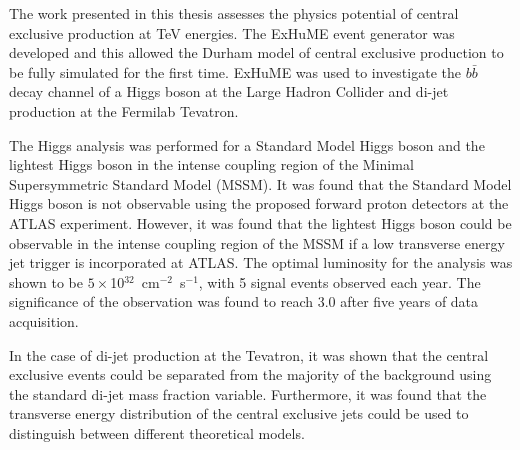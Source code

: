 The work presented in this thesis assesses the physics potential of central exclusive production at TeV energies. 
The ExHuME event generator was developed and this allowed the Durham model of central exclusive production to be fully simulated for the first time. ExHuME was used to investigate the $b\bar{b}$ decay channel of a Higgs boson at the Large Hadron Collider and di-jet production at the Fermilab Tevatron.

The Higgs analysis was performed for a Standard Model Higgs boson and the lightest Higgs boson in the intense coupling region of the Minimal Supersymmetric Standard Model (MSSM).
It was found that the Standard Model Higgs boson is not observable using the proposed forward proton detectors at the ATLAS experiment. However, it was found that the lightest Higgs boson could be observable in the intense coupling region of the MSSM 
if a low transverse energy jet trigger is incorporated at ATLAS. The optimal luminosity for the analysis was shown to be $5\times$10$^{32}$~cm$^{-2}$~s$^{-1}$, with 5 signal events observed each year. The significance of the observation was found to reach 3.0 after five years of data acquisition. 

In the case of di-jet production at the Tevatron, it was shown that the central exclusive events could be separated from the majority of the background using the standard di-jet mass fraction variable. Furthermore, it was found that the transverse energy distribution of the central exclusive jets could be used to distinguish between different theoretical models. 

